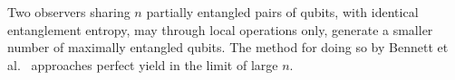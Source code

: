 Two observers sharing $n$ partially entangled pairs of qubits, with identical entanglement entropy, may through local operations only, generate a smaller number of maximally entangled qubits.
The method for doing so by Bennett et al.~\cite{bennett1996concentrating} approaches perfect yield in the limit of large $n$.